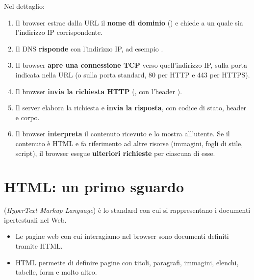 Nel dettaglio:

\begin{enumerate}
  \item Il browser estrae dalla URL il \textbf{nome di dominio}
        () e chiede a un  quale sia
        l'indirizzo IP corrispondente.
  \item Il DNS \textbf{risponde} con l'indirizzo IP, ad esempio
        .
  \item Il browser \textbf{apre una connessione TCP} verso quell'indirizzo IP,
        sulla porta indicata nella URL (o sulla porta standard, 80 per HTTP e
        443 per HTTPS).
  \item Il browser \textbf{invia la richiesta HTTP}
        (, con l'header ).
  \item Il server elabora la richiesta e \textbf{invia la risposta}, con codice
        di stato, header e corpo.
  \item Il browser \textbf{interpreta} il contenuto ricevuto e lo mostra
        all'utente. Se il contenuto è HTML e fa riferimento ad altre risorse
        (immagini, fogli di stile, script), il browser esegue \textbf{ulteriori
        richieste} per ciascuna di esse.
\end{enumerate}


\section{HTML: un primo sguardo}

 (\textit{HyperText Markup Language}) è lo standard con cui si
rappresentano i documenti ipertestuali nel Web.

\begin{itemize}
  \item Le pagine web con cui interagiamo nel browser sono documenti definiti
        tramite HTML.
  \item HTML permette di definire pagine con titoli, paragrafi, immagini,
        elenchi, tabelle, form e molto altro.
\end{itemize}

